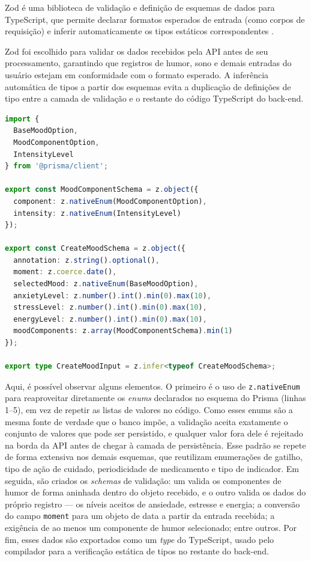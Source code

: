 Zod é uma biblioteca de validação e definição de esquemas de dados para
TypeScript, que permite declarar formatos esperados de entrada (como corpos
de requisição) e inferir automaticamente os tipos estáticos correspondentes
\citep{zod:2026}.

Zod foi escolhido para validar os dados recebidos pela API antes de seu
processamento, garantindo que registros de humor, sono e demais entradas do
usuário estejam em conformidade com o formato esperado. A inferência
automática de tipos a partir dos esquemas evita a duplicação de definições de
tipo entre a camada de validação e o restante do código TypeScript do
back-end.

\begin{lstlisting}[language=typescript, caption={Validação e Inferência usando Zod}, label={lst:zod-inference}]
import {
  BaseMoodOption,
  MoodComponentOption,
  IntensityLevel
} from '@prisma/client';

export const MoodComponentSchema = z.object({
  component: z.nativeEnum(MoodComponentOption),
  intensity: z.nativeEnum(IntensityLevel)
});

export const CreateMoodSchema = z.object({
  annotation: z.string().optional(),
  moment: z.coerce.date(),
  selectedMood: z.nativeEnum(BaseMoodOption),
  anxietyLevel: z.number().int().min(0).max(10),
  stressLevel: z.number().int().min(0).max(10),
  energyLevel: z.number().int().min(0).max(10),
  moodComponents: z.array(MoodComponentSchema).min(1)
});

export type CreateMoodInput = z.infer<typeof CreateMoodSchema>;
\end{lstlisting}


Aqui, é possível observar alguns elementos. O primeiro é o uso de
\texttt{z.nativeEnum} para reaproveitar diretamente os \textit{enums}
declarados no esquema do Prisma (linhas 1--5), em vez de repetir as listas de
valores no código. Como esses enums são a mesma fonte de verdade que o banco
impõe, a validação aceita exatamente o conjunto de valores que pode ser
persistido, e qualquer valor fora dele é rejeitado na borda da API antes de
chegar à camada de persistência. Esse padrão se repete de forma extensiva nos
demais esquemas, que reutilizam enumerações de gatilho, tipo de ação de
cuidado, periodicidade de medicamento e tipo de indicador. Em seguida, são
criados os \textit{schemas} de validação: um valida os componentes
de humor de forma aninhada dentro do objeto recebido, e o outro valida os dados
do próprio registro --- os níveis aceitos de ansiedade, estresse e energia; a
conversão do campo \texttt{moment} para um objeto de data a partir da entrada
recebida; a exigência de ao menos um componente de humor selecionado; entre
outros. Por fim, esses dados são exportados como um \textit{type} do
TypeScript, usado pelo compilador para a verificação estática de tipos no
restante do back-end.

